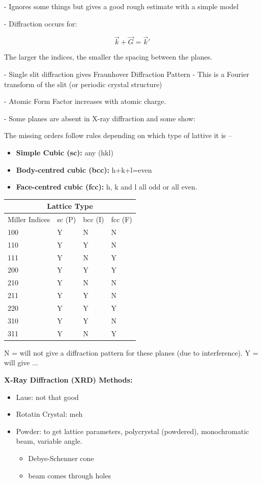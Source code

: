 - Ignores some things but gives a good rough estimate with a simple model

- Diffraction occurs for:

\[ \vec{k} + \vec{G} = \vec{k}' \]

The larger the indices, the smaller the spacing between the planes.

- Single slit diffraction gives Fraunhover Diffraction Pattern
- This is a Fourier transform of the slit (or periodic crystal structure)

-   Atomic Form Factor increases with atomic charge.

- Some planes are absent in X-ray diffraction and some show:

The missing orders follow rules depending on which type of lattive it is -- 
\begin{itemize}
    \item \textbf{Simple Cubic (sc):} any (hkl)
    \item \textbf{Body-centred cubic (bcc):} h+k+l=even
    \item \textbf{Face-centred cubic (fcc):} h, k and l all odd or all even.
    
\end{itemize}
\begin{tabular}{ |p{3cm}||p{3cm}|p{3cm}|p{3cm}|  }
 \hline
 \multicolumn{4}{|c|}{\textbf{Lattice Type}} \\
 \hline
 Miller Indices & sc (P) & bcc (I) & fcc (F)\\
 \hline
 100 & Y & N & N\\
 110 & Y & Y & N\\
 111 & Y & N & Y\\
 200 & Y & Y & Y\\
 210 & Y & N & N\\
 211 & Y & Y & N\\
 220 & Y & Y & Y\\
 310 & Y & Y & N \\
 311 & Y & N & Y \\
 \hline
\end{tabular}

N = will not give a diffraction pattern for these planes (due to interference).
Y = will give ...

\textbf{X-Ray Diffraction (XRD) Methods:}
\begin{itemize}
    \item Laue: not that good
    \item Rotatin Crystal: meh
    \item Powder: to get lattice parameters, polycrystal (powdered), monochromatic beam, variable angle.
    \begin{itemize}
        \item Debye-Schenner cone
        \item beam comes through holes
    \end{itemize}
\end{itemize}


